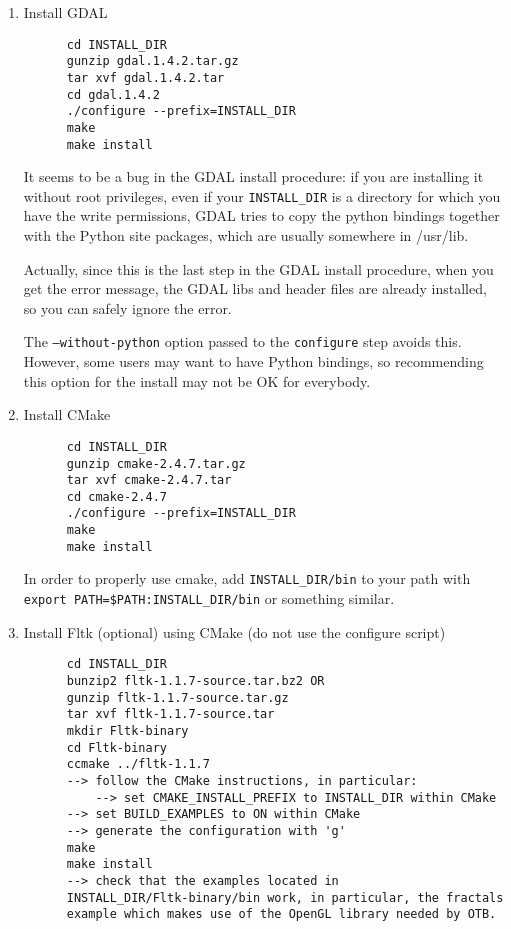 \begin{enumerate}
    
\item Install GDAL
  \begin{verbatim}
      cd INSTALL_DIR
      gunzip gdal.1.4.2.tar.gz
      tar xvf gdal.1.4.2.tar
      cd gdal.1.4.2
      ./configure --prefix=INSTALL_DIR
      make
      make install
  \end{verbatim}

It seems to be a bug in the GDAL install procedure: if you are installing it without root privileges, even if your \texttt{INSTALL\_DIR} is a directory for which you have the write permissions, GDAL tries to copy the python bindings together with the Python site packages, which are usually somewhere in /usr/lib.

Actually, since this is the last step in the GDAL install procedure, when you get the error message, the GDAL libs and header files are already installed, so you can safely ignore the error.

The \texttt{--without-python} option passed to the \texttt{configure} step avoids this. However, some users may want to have Python bindings, so recommending this option for the install may not be OK for everybody. 

\item Install CMake
  \begin{verbatim}
      cd INSTALL_DIR
      gunzip cmake-2.4.7.tar.gz
      tar xvf cmake-2.4.7.tar
      cd cmake-2.4.7
      ./configure --prefix=INSTALL_DIR
      make
      make install
  \end{verbatim}
      In order to properly use cmake, add \texttt{INSTALL\_DIR/bin} to
      your path with \texttt{export PATH=\$PATH:INSTALL\_DIR/bin} or
      something similar.

\item Install Fltk (optional) using CMake (do not use the configure script)
  \begin{verbatim}
      cd INSTALL_DIR
      bunzip2 fltk-1.1.7-source.tar.bz2 OR
      gunzip fltk-1.1.7-source.tar.gz
      tar xvf fltk-1.1.7-source.tar
      mkdir Fltk-binary
      cd Fltk-binary
      ccmake ../fltk-1.1.7
      --> follow the CMake instructions, in particular:
          --> set CMAKE_INSTALL_PREFIX to INSTALL_DIR within CMake
	  --> set BUILD_EXAMPLES to ON within CMake
	  --> generate the configuration with 'g'
      make
      make install
      --> check that the examples located in
      INSTALL_DIR/Fltk-binary/bin work, in particular, the fractals
      example which makes use of the OpenGL library needed by OTB.
  \end{verbatim}
      

\end{enumerate}
